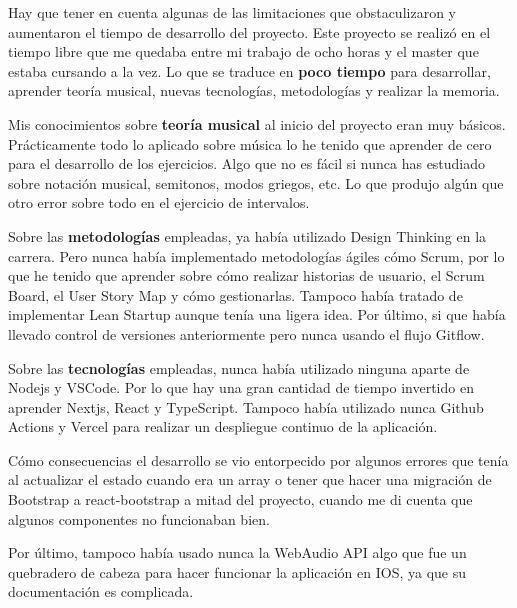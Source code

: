 \documentclass[12pt,twoside,titlepage]{report}
\begin{document}
Hay que tener en cuenta algunas de las limitaciones que obstaculizaron y aumentaron el tiempo de desarrollo del proyecto. Este proyecto se realizó en el tiempo libre que me quedaba entre mi trabajo de ocho horas y el master que estaba cursando a la vez. Lo que se traduce en \textbf{poco tiempo} para desarrollar, aprender teoría musical, nuevas tecnologías, metodologías y realizar la memoria. 

Mis conocimientos sobre \textbf{teoría musical} al inicio del proyecto eran muy básicos. Prácticamente todo lo aplicado sobre música lo he tenido que aprender de cero para el desarrollo de los ejercicios. Algo que no es fácil si nunca has estudiado sobre notación musical, semitonos, modos griegos, etc. Lo que produjo algún que otro error sobre todo en el ejercicio de intervalos.

Sobre las \textbf{metodologías} empleadas, ya había utilizado Design Thinking en la carrera. Pero nunca había implementado metodologías ágiles cómo Scrum, por lo que he tenido que aprender sobre cómo realizar historias de usuario, el Scrum Board, el User Story Map y cómo gestionarlas. Tampoco había tratado de implementar Lean Startup aunque tenía una ligera idea. Por último, si que había llevado control de versiones anteriormente pero nunca usando el flujo Gitflow.

Sobre las \textbf{tecnologías} empleadas, nunca había utilizado ninguna aparte de Nodejs y VSCode. Por lo que hay una gran cantidad de tiempo invertido en aprender Nextjs, React y TypeScript. Tampoco había utilizado nunca Github Actions y Vercel para realizar un despliegue continuo de la aplicación. 

Cómo consecuencias el desarrollo se vio entorpecido por algunos errores que tenía al actualizar el estado cuando era un array o tener que hacer una migración de Bootstrap a react-bootstrap a mitad del proyecto, cuando me di cuenta que algunos componentes no funcionaban bien. 

Por último, tampoco había usado nunca la WebAudio API algo que fue un quebradero de cabeza para hacer funcionar la aplicación en IOS, ya que su documentación es complicada.
\end{document}
